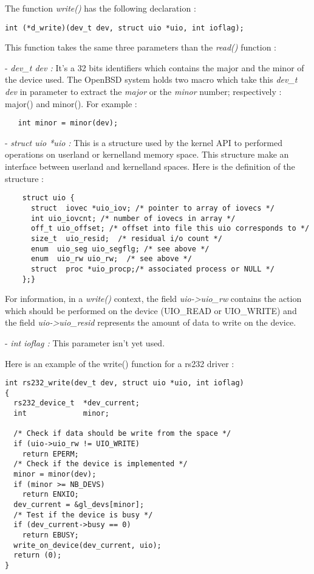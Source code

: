 \documentclass[11pt]{report}
\begin{document}
The function {\it write()} has the following declaration :
\begin{lstlisting}
int (*d_write)(dev_t dev, struct uio *uio, int ioflag);
\end{lstlisting}
This function takes the same three parameters than the {\it read()} function :
\begin{description}
  \item{- {\it dev\_t dev :} It's a 32 bits identifiers which contains the major and the
  minor of the device used. The OpenBSD system holds two macro which take this
  {\it dev\_t dev} in parameter to extract the {\it major} or the {\it minor} number;
  respectively : major() and minor(). For example :
  \begin{lstlisting}
   int minor = minor(dev);
  \end{lstlisting}
  }
  \item{- {\it struct uio *uio :} This is a structure used by the kernel API to performed
  operations on userland or kernelland memory space. This structure make an interface
  between userland and kernelland spaces. Here is the definition of the structure :
  \begin{lstlisting}
    struct uio {
      struct  iovec *uio_iov; /* pointer to array of iovecs */
      int uio_iovcnt; /* number of iovecs in array */
      off_t uio_offset; /* offset into file this uio corresponds to */
      size_t  uio_resid;  /* residual i/o count */
      enum  uio_seg uio_segflg; /* see above */
      enum  uio_rw uio_rw;  /* see above */
      struct  proc *uio_procp;/* associated process or NULL */
    };}
  \end{lstlisting}
  For information, in a {\it write()} context, the field {\it uio-\textgreater uio\_rw} contains
  the action which should be performed on the device (UIO\_READ or UIO\_WRITE) and
  the field {\it uio-\textgreater uio\_resid} represents the amount of data to write on the device.}
  \item{- {\it int ioflag :} This parameter isn't yet used.}
\end{description}
Here is an example of the write() function for a rs232 driver :
\begin{lstlisting}
int rs232_write(dev_t dev, struct uio *uio, int ioflag)
{
  rs232_device_t  *dev_current;
  int             minor;

  /* Check if data should be write from the space */
  if (uio->uio_rw != UIO_WRITE)
    return EPERM;
  /* Check if the device is implemented */
  minor = minor(dev);
  if (minor >= NB_DEVS)
    return ENXIO;
  dev_current = &gl_devs[minor];
  /* Test if the device is busy */
  if (dev_current->busy == 0)
    return EBUSY;
  write_on_device(dev_current, uio);
  return (0);
}
\end{lstlisting}
\end{document}
